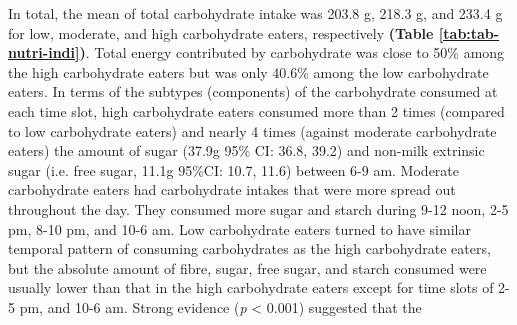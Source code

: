 In total, the mean of total carbohydrate intake was 203.8 g, 218.3 g, and 233.4 g for low, moderate, and high carbohydrate eaters, respectively \textbf{(Table \ref{tab:tab-nutri-indi})}. Total energy contributed by carbohydrate was close to 50\% among the high carbohydrate eaters but was only 40.6\% among the low carbohydrate eaters. In terms of the subtypes (components) of the carbohydrate consumed at each time slot, high carbohydrate eaters consumed more than 2 times (compared to low carbohydrate eaters) and nearly 4 times (against moderate carbohydrate eaters) the amount of sugar (37.9g 95\% CI: 36.8, 39.2) and non-milk extrinsic sugar (i.e. free sugar, 11.1g 95\%CI: 10.7, 11.6) between 6-9 am. Moderate carbohydrate eaters had carbohydrate intakes that were more spread out throughout the day. They consumed more sugar and starch during 9-12 noon, 2-5 pm, 8-10 pm, and 10-6 am. Low carbohydrate eaters turned to have similar temporal pattern of consuming carbohydrates as the high carbohydrate eaters, but the absolute amount of fibre, sugar, free sugar, and starch consumed were usually lower than that in the high carbohydrate eaters except for time slots of 2-5 pm, and 10-6 am. Strong evidence (\textit{p} < 0.001) suggested that the





